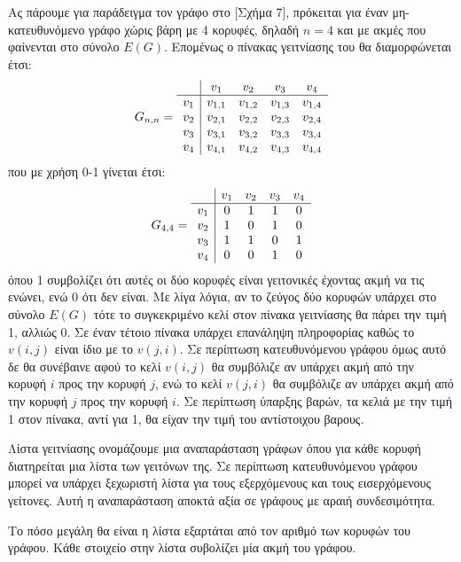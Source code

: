 Ας πάρουμε για παράδειγμα τον γράφο στο [Σχήμα 7], πρόκειται για έναν μη-κατευθυνόμενο γράφο χώρις βάρη με 4 κορυφές, δηλαδή $n=4$ και με ακμές που φαίνενται στο σύνολο $E(G)$. Επομένως ο πίνακας γειτνίασης του θα διαμορφώνεται έτσι: 
$$
G_{n,n} = 
 \begin{array}{c|c c c c}
    & v_{1} & v_{2} & v_{3} & v_{4} \\ \hline
    v_{1} & v_{1,1} & v_{1,2} & v_{1,3} & v_{1,4} \\
    v_{2} & v_{2,1} & v_{2,2} &   v_{2,3} & v_{2,4} \\
    v_{3} & v_{3,1} & v_{3,2} & v_{3,3} & v_{3,4} \\
    v_{4} & v_{4,1} & v_{4,2} & v_{4,3} & v_{4,4} 
 \end{array}
 $$
 που με χρήση 0-1 γίνεται έτσι: 
 $$
G_{4,4} = 
 \begin{array}{c|c c c c}
    & v_{1} & v_{2} & v_{3} & v_{4} \\ \hline
    v_{1} & 0 & 1 & 1 & 0 \\
    v_{2} & 1 & 0 & 1 & 0 \\
    v_{3} & 1 & 1 & 0 & 1 \\
    v_{4} & 0 & 0 & 1 & 0 
 \end{array}
 $$
όπου 1 συμβολίζει ότι αυτές οι δύο κορυφές είναι γειτονικές έχοντας ακμή να τις ενώνει, ενώ 0 ότι δεν είναι. Με λίγα λόγια, αν το ζεύγος δύο κορυφών υπάρχει στο σύνολο $E(G)$ τότε το συγκεκριμένο κελί στον πίνακα γειτνίασης θα πάρει την τιμή 1, αλλιώς 0. Σε έναν τέτοιο πίνακα υπάρχει επανάληψη πληροφορίας καθώς το $v(i,j)$ είναι ίδιο με το $v(j,i)$. Σε περίπτωση κατευθυνόμενου γράφου όμως αυτό δε θα συνέβαινε αφού το κελί $v(i,j)$ θα συμβόλιζε αν υπάρχει ακμή από την κορυφή $i$ προς την κορυφή $j$, ενώ το κελί $v(j,i)$ θα συμβόλιζε αν υπάρχει ακμή από την κορυφή $j$ προς την κορυφή $i$. Σε περίπτωση ύπαρξης βαρών, τα κελιά με την τιμή 1 στον πίνακα, αντί για 1, θα είχαν την τιμή του αντίστοιχου βαρους. 

Λίστα γειτνίασης ονομάζουμε μια αναπαράσταση γράφων όπου για κάθε κορυφή διατηρείται μια λίστα των γειτόνων της. Σε περίπτωση κατευθυνόμενου γράφου μπορεί να υπάρχει ξεχωριστή λίστα για τους εξερχόμενους και τους εισερχόμενους γείτονες. Αυτή η αναπαράσταση αποκτά αξία σε γράφους με αραιή συνδεσιμότητα. 

Το πόσο μεγάλη θα είναι η λίστα εξαρτάται από τον αριθμό των κορυφών του γράφου. Κάθε στοιχείο στην λίστα συβολίζει μία ακμή του γράφου.
 
